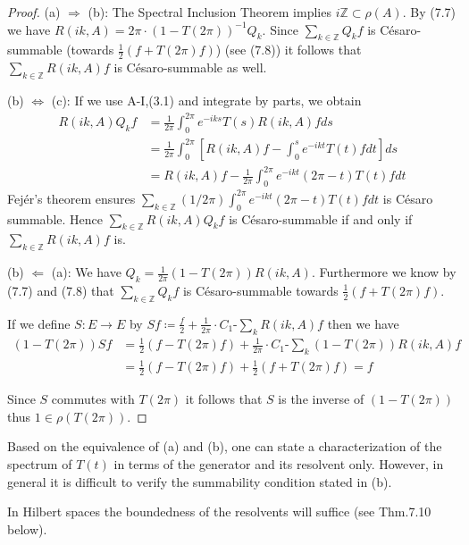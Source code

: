 \begin{proof}
	(a) $\Rightarrow$ (b): The Spectral Inclusion Theorem implies $i\mathbb{Z} \subset \rho(A)$.
	By (7.7) we have $R(ik,A) = 2\pi\cdot(1-T(2\pi))^{-1}Q_{k}$.
	Since $\sum_{k\in\mathbb{Z}} Q_{k}f$ is Césaro-summable (towards $\frac{1}{2}(f + T(2\pi)f)$) (see (7.8)) it follows that $\sum_{k\in\mathbb{Z}} R(ik,A)f$ is Césaro-summable as well.
	
	(b) $\Leftrightarrow$ (c): If we use A-I,(3.1) and integrate by parts, we obtain
	\begin{align*}
		R(ik,A)Q_{k}f &= \frac{1}{2\pi}\int_{0}^{2\pi} e^{-iks} T(s)R(ik,A)f ds \\
		&= \frac{1}{2\pi}\int_{0}^{2\pi} [R(ik,A)f - \int_{0}^{s} e^{-ikt} T(t)f dt] ds \\
		&= R(ik,A)f - \frac{1}{2\pi}\int_{0}^{2\pi} e^{-ikt} (2\pi-t) T(t)f dt
	\end{align*}
	Fejér's theorem ensures $\sum_{k\in\mathbb{Z}} (1/2\pi)\int_{0}^{2\pi} e^{-ikt} (2\pi-t) T(t)f dt$ is Césaro summable.
	Hence $\sum_{k\in\mathbb{Z}} R(ik,A)Q_{k}f$ is Césaro-summable if and only if $\sum_{k\in\mathbb{Z}} R(ik,A)f$ is.
	
	(b) $\Leftarrow$ (a): We have $Q_{k} = \frac{1}{2\pi}(1 - T(2\pi))R(ik,A)$.
	Furthermore we know by (7.7) and (7.8) that $\sum_{k\in\mathbb{Z}} Q_{k}f$ is Césaro-summable towards $\frac{1}{2}(f + T(2\pi)f)$.
	
	If we define $S \colon E \to E$ by $Sf \coloneqq \frac{f}{2} + \frac{1}{2\pi}\cdot C_{1}\text{-}\sum_k R(ik,A)f$ then we have
	\begin{align*}
		(1 - T(2\pi))Sf &= \frac{1}{2}(f - T(2\pi)f) + \frac{1}{2\pi}\cdot C_{1}\text{-}\sum_k (1 - T(2\pi))R(ik,A)f \\
		&= \frac{1}{2}(f - T(2\pi)f) + \frac{1}{2}(f + T(2\pi)f) = f
	\end{align*}
	
	Since $S$ commutes with $T(2\pi)$ it follows that $S$ is the inverse of $(1 - T(2\pi))$ thus $1 \in \rho(T(2\pi))$.
\end{proof}

Based on the equivalence of (a) and (b), one can state a characterization of the spectrum of $T(t)$ in terms of the generator and its resolvent only.
However, in general it is difficult to verify the summability condition stated in (b).

In Hilbert spaces the boundedness of the resolvents will suffice (see Thm.7.10 below).

